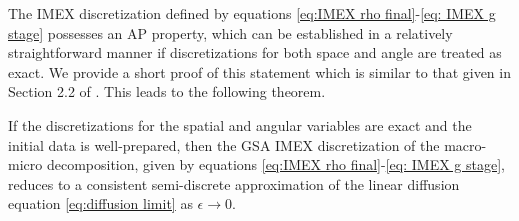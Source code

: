 \documentclass[onefignum,onetabnum]{siamart220329}
\begin{document}
The IMEX discretization defined by equations \eqref{eq:IMEX rho final}-\eqref{eq: IMEX g stage} possesses an AP property, which can be established in a relatively straightforward manner if discretizations for both space and angle are treated as exact. We provide a short proof of this statement which is similar to that given in Section 2.2 of \cite{BoscarinoAP-IMEX2013}. This leads to the following theorem. 
\begin{theorem}
    \label{thm:MM AP property IMEX}
    If the discretizations for the spatial and angular variables are exact and the initial data is well-prepared, then the GSA IMEX discretization of the macro-micro decomposition, given by equations \eqref{eq:IMEX rho final}-\eqref{eq: IMEX g stage}, reduces to a consistent semi-discrete approximation of the linear diffusion equation \eqref{eq:diffusion limit} as $\epsilon \rightarrow 0$.
\end{theorem}
\end{document}
